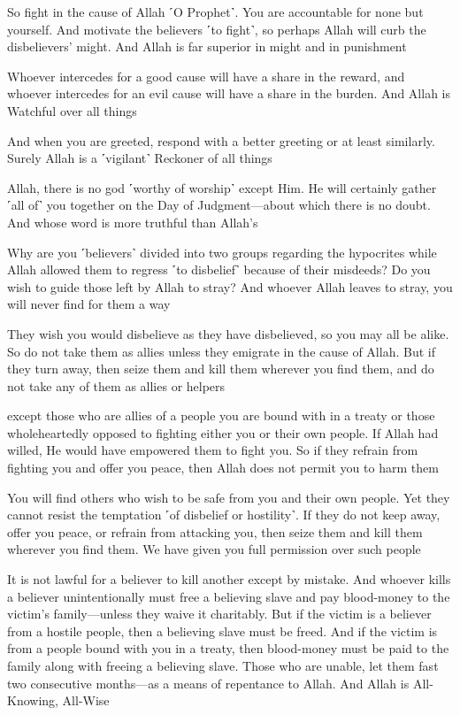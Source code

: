 So fight in the cause of Allah ˹O Prophet˺. You are accountable for none but yourself. And motivate the believers ˹to fight˺, so perhaps Allah will curb the disbelievers’ might. And Allah is far superior in might and in punishment

Whoever intercedes for a good cause will have a share in the reward, and whoever intercedes for an evil cause will have a share in the burden. And Allah is Watchful over all things

And when you are greeted, respond with a better greeting or at least similarly. Surely Allah is a ˹vigilant˺ Reckoner of all things

Allah, there is no god ˹worthy of worship˺ except Him. He will certainly gather ˹all of˺ you together on the Day of Judgment—about which there is no doubt. And whose word is more truthful than Allah’s

Why are you ˹believers˺ divided into two groups regarding the hypocrites while Allah allowed them to regress ˹to disbelief˺ because of their misdeeds? Do you wish to guide those left by Allah to stray? And whoever Allah leaves to stray, you will never find for them a way

They wish you would disbelieve as they have disbelieved, so you may all be alike. So do not take them as allies unless they emigrate in the cause of Allah. But if they turn away, then seize them and kill them wherever you find them, and do not take any of them as allies or helpers

except those who are allies of a people you are bound with in a treaty or those wholeheartedly opposed to fighting either you or their own people. If Allah had willed, He would have empowered them to fight you. So if they refrain from fighting you and offer you peace, then Allah does not permit you to harm them

You will find others who wish to be safe from you and their own people. Yet they cannot resist the temptation ˹of disbelief or hostility˺. If they do not keep away, offer you peace, or refrain from attacking you, then seize them and kill them wherever you find them. We have given you full permission over such people

It is not lawful for a believer to kill another except by mistake. And whoever kills a believer unintentionally must free a believing slave and pay blood-money to the victim’s family—unless they waive it charitably. But if the victim is a believer from a hostile people, then a believing slave must be freed. And if the victim is from a people bound with you in a treaty, then blood-money must be paid to the family along with freeing a believing slave. Those who are unable, let them fast two consecutive months—as a means of repentance to Allah. And Allah is All-Knowing, All-Wise

